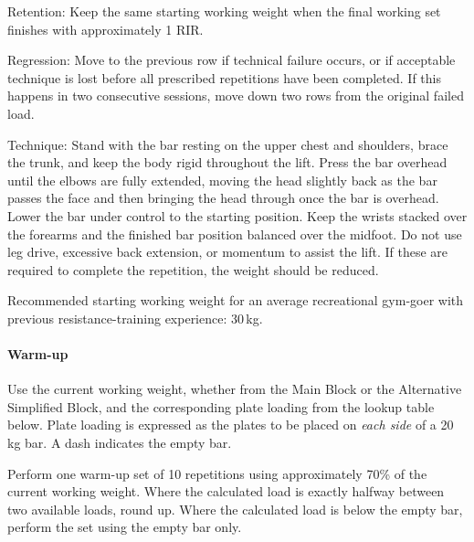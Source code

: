 \documentclass[11pt,a4paper]{article}
\begin{document}
Retention: Keep the same starting working weight when the final working set finishes with approximately 1 RIR.

Regression: Move to the previous row if technical failure occurs, or if acceptable technique is lost before all prescribed repetitions have been completed. If this happens in two consecutive sessions, move down two rows from the original failed load.

Technique: Stand with the bar resting on the upper chest and shoulders, brace the trunk, and keep the body rigid throughout the lift. Press the bar overhead until the elbows are fully extended, moving the head slightly back as the bar passes the face and then bringing the head through once the bar is overhead. Lower the bar under control to the starting position. Keep the wrists stacked over the forearms and the finished bar position balanced over the midfoot. Do not use leg drive, excessive back extension, or momentum to assist the lift. If these are required to complete the repetition, the weight should be reduced.

Recommended starting working weight for an average recreational gym-goer with previous resistance-training experience: 30\,kg.

\paragraph{Warm-up}

Use the current working weight, whether from the Main Block or the Alternative Simplified Block, and the corresponding plate loading from the lookup table below. Plate loading is expressed as the plates to be placed on \emph{each side} of a 20\,kg bar. A dash indicates the empty bar.

Perform one warm-up set of 10 repetitions using approximately 70\% of the current working weight. Where the calculated load is exactly halfway between two available loads, round up. Where the calculated load is below the empty bar, perform the set using the empty bar only.
\end{document}
